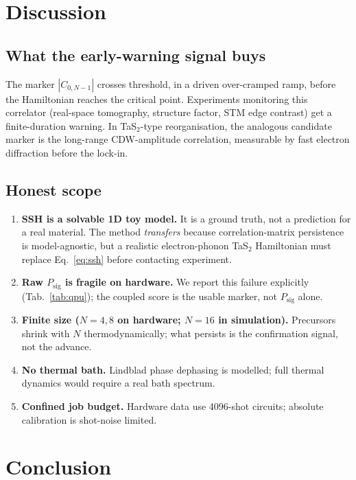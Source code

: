 \documentclass[11pt]{article}
\begin{document}
\section{Discussion}
\label{sec:limits}

\subsection{What the early-warning signal buys}

The marker $|C_{0,N-1}|$ crosses threshold, in a driven over-cramped ramp,
before the Hamiltonian reaches the critical point. Experiments monitoring
this correlator (real-space tomography, structure factor, STM edge contrast)
get a finite-duration warning. In TaS$_2$-type reorganisation, the analogous
candidate marker is the long-range CDW-amplitude correlation, measurable by
fast electron diffraction before the lock-in.

\subsection{Honest scope}

\begin{enumerate}
\item \textbf{SSH is a solvable 1D toy model.} It is a ground truth, not a
prediction for a real material. The method \emph{transfers} because
correlation-matrix persistence is model-agnostic, but a realistic
electron-phonon TaS$_2$ Hamiltonian must replace Eq.~\eqref{eq:ssh} before
contacting experiment.
\item \textbf{Raw $P_{\mathrm{sig}}$ is fragile on hardware.} We report this
failure explicitly (Tab.~\ref{tab:qpu}); the coupled score is the usable
marker, not $P_{\mathrm{sig}}$ alone.
\item \textbf{Finite size ($N=4,8$ on hardware; $N=16$ in simulation).}
Precursors shrink with $N$ thermodynamically; what persists is the
confirmation signal, not the advance.
\item \textbf{No thermal bath.} Lindblad phase dephasing is modelled; full
thermal dynamics would require a real bath spectrum.
\item \textbf{Confined job budget.} Hardware data use 4096-shot circuits;
absolute calibration is shot-noise limited.
\end{enumerate}

\section{Conclusion}
\label{sec:conclusion}
\end{document}
